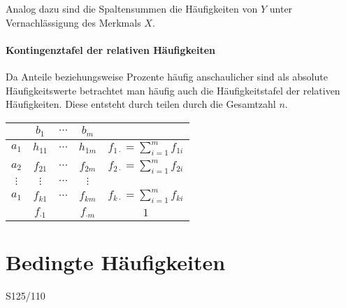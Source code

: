 Analog dazu sind die Spaltensummen die Häufigkeiten von $Y$ unter Vernachlässigung des Merkmals $X$.

\paragraph{Kontingenztafel der relativen Häufigkeiten}
Da Anteile beziehungsweise Prozente häufig anschaulicher sind als absolute Häufigkeitswerte betrachtet man häufig auch die Häufigkeitstafel der relativen Häufigkeiten. Diese entsteht durch teilen durch die Gesamtzahl $n$.

\begin{center}
	\begin{tabular}{c|ccc|c}
		& $b_1$ & $\cdots$ & $b_m$ &\\
		\hline $a_1$ & $h_{11}$ & $\cdots$ & $h_{1m}$&$f_{1\cdot}=\sum_{i=1}^m f_{1i}$\\
		$a_2$ & $f_{21}$ & $\cdots$ & $f_{2m}$&$f_{2\cdot}=\sum_{i=1}^m f_{2i}$\\
		$\vdots$ & $\vdots$ & $\cdots$ & $\vdots$&\\
		$a_1$ & $f_{k1}$ & $\cdots$ & $f_{km}$&$f_{k\cdot}=\sum_{i=1}^m f_{ki}$\\
		\hline &$f_{\cdot1}$&&$f_{\cdot m}$&$1$
	\end{tabular}
\end{center}

\section{Bedingte Häufigkeiten}
S125/110